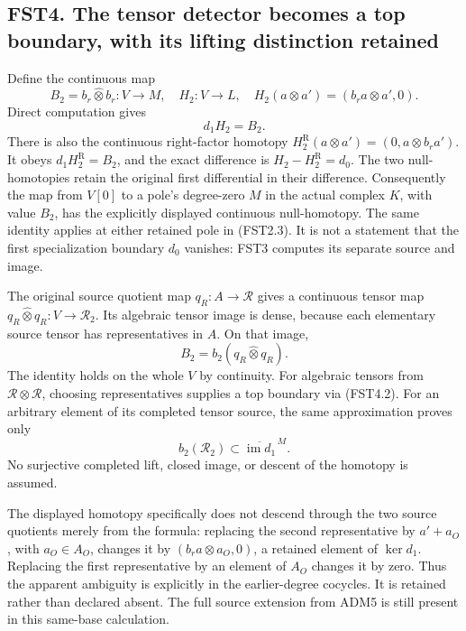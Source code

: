 \subsection{FST4. The tensor detector becomes a top boundary, with its
lifting distinction
retained}\label{fst4.-the-tensor-detector-becomes-a-top-boundary-with-its-lifting-distinction-retained}

Define the continuous map \[
B_2=b_r\widehat\otimes b_r:V\to M,
\quad H_2:V\to L,
\quad H_2(a\otimes a')=(b_ra\otimes a',0).
\tag{FST4.1}
\] Direct computation gives \[
\boxed{\quad d_1H_2=B_2.\quad}
\tag{FST4.2}
\] There is also the continuous right-factor homotopy
\(H_2^{\mathrm R}(a\otimes a')=(0,a\otimes b_ra')\). It obeys
\(d_1H_2^{\mathrm R}=B_2\), and the exact difference is
\(H_2-H_2^{\mathrm R}=d_0\). The two null-homotopies retain the original
first differential in their difference. Consequently the map from
\(V[0]\) to a pole's degree-zero \(M\) in the actual complex \(K\), with
value \(B_2\), has the explicitly displayed continuous null-homotopy.
The same identity applies at either retained pole in (FST2.3). It is not
a statement that the first specialization boundary \(d_0\) vanishes:
FST3 computes its separate source and image.

The original source quotient map \(q_R:A\to\mathcal R\) gives a
continuous tensor map \(q_R\widehat\otimes q_R:V\to\mathscr R_2\). Its
algebraic tensor image is dense, because each elementary source tensor
has representatives in \(A\). On that image, \[
B_2=b_2(q_R\widehat\otimes q_R).
\tag{FST4.3}
\] The identity holds on the whole \(V\) by continuity. For algebraic
tensors from \(\mathcal R\otimes\mathcal R\), choosing representatives
supplies a top boundary via (FST4.2). For an arbitrary element of its
completed tensor source, the same approximation proves only \[
b_2(\mathscr R_2)\subset\overline{\operatorname{im}d_1}^{\,M}.
\tag{FST4.4}
\] No surjective completed lift, closed image, or descent of the
homotopy is assumed.

The displayed homotopy specifically does not descend through the two
source quotients merely from the formula: replacing the second
representative by \(a'+a_O\), with \(a_O\in A_O\), changes it by
\((b_ra\otimes a_O,0)\), a retained element of \(\ker d_1\). Replacing
the first representative by an element of \(A_O\) changes it by zero.
Thus the apparent ambiguity is explicitly in the earlier-degree
cocycles. It is retained rather than declared absent. The full source
extension from ADM5 is still present in this same-base calculation.


